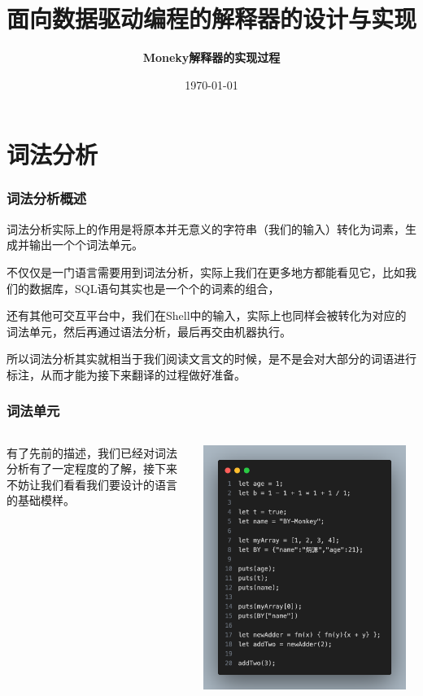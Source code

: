 \documentclass{beamer}
\title{面向数据驱动编程的解释器的设计与实现}
\subtitle{\fontsize{9pt}{14pt}\textbf{Moneky解释器的实现过程}}
\author{}
\institute{}
\date{\today}
\begin{document}
	\maketitle
	\setlength{\parindent}{2em}
    \section{词法分析}
    \begin{frame}
        \frametitle{词法分析概述}

        词法分析实际上的作用是将原本并无意义的字符串（我们的输入）转化为词素，生成并输出一个个词法单元。

        不仅仅是一门语言需要用到词法分析，实际上我们在更多地方都能看见它，比如我们的数据库，SQL语句其实也是一个个的词素的组合，
        
        还有其他可交互平台中，我们在Shell中的输入，实际上也同样会被转化为对应的词法单元，然后再通过语法分析，最后再交由机器执行。

        所以词法分析其实就相当于我们阅读文言文的时候，是不是会对大部分的词语进行标注，从而才能为接下来翻译的过程做好准备。
    \end{frame}
    \begin{frame}
        \frametitle{词法单元}
        \begin{columns}
		
        有了先前的描述，我们已经对词法分析有了一定程度的了解，接下来不妨让我们看看我们要设计的语言的基础模样。
		
		\centering
		\includegraphics[width=0.95\textwidth]{pics/code0-0}
		\end{columns}
    
        
    \end{frame}
\end{document}
